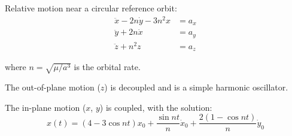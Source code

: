 Relative motion near a circular reference orbit:
\begin{align}
\ddot{x} - 2n\dot{y} - 3n^2 x &= a_x \\
\ddot{y} + 2n\dot{x} &= a_y \\
\ddot{z} + n^2 z &= a_z
\end{align}

where $n = \sqrt{\mu/a^3}$ is the orbital rate.

The out-of-plane motion ($z$) is decoupled and is a simple harmonic oscillator.

The in-plane motion ($x$, $y$) is coupled, with the solution:
\begin{equation}
x(t) = (4 - 3\cos nt)x_0 + \frac{\sin nt}{n}\dot{x}_0 + \frac{2(1-\cos nt)}{n}\dot{y}_0
\end{equation}

